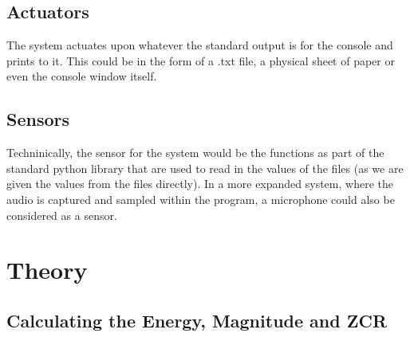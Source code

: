 \documentclass[12pt]{article} %
\begin{document}
\subsection{Actuators}
The system actuates upon whatever the standard output is for the console and prints to it. This
could be in the form of a .txt file, a physical sheet of paper or even the console window itself.

\subsection{Sensors}
Techninically, the sensor for the system would be the functions as part of the standard python
library that are used to read in the values of the files (as we are given the values from the files
directly). In a more expanded system, where the audio is captured and sampled within the program, a
microphone could also be considered as a sensor.
\newpage
\section{Theory}
\subsection{Calculating the Energy, Magnitude and ZCR}
\end{document}
